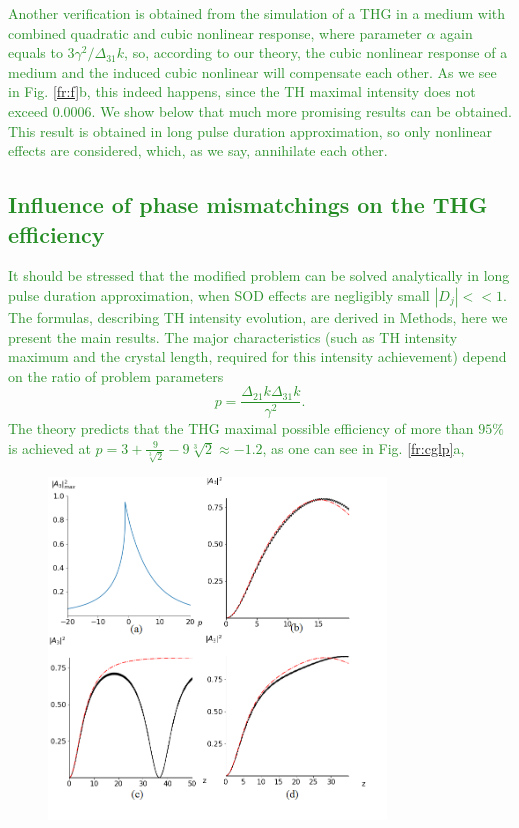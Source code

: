 \documentclass[a4paper, 12pt, onecolumn]{extarticle}
\begin{document}
\textcolor{ForestGreen}
{
Another verification is obtained from the simulation of a THG in a medium with combined quadratic and cubic nonlinear response, where parameter $\alpha$ again equals to $3\gamma^2/\Delta_{31}k$, so, according to our theory, the cubic nonlinear response of a medium and the induced cubic nonlinear will compensate each other. As we see in Fig. \ref{fr:f}b, this indeed happens, since the TH maximal intensity does not exceed $0.0006$. We show below that much more promising results can be obtained. This result is obtained in long pulse duration approximation, so only nonlinear effects are considered, which, as we say, annihilate each other.  
}

\textcolor{ForestGreen}
{
\subsection{Influence of phase mismatchings on the THG efficiency}
It should be stressed that the modified problem can be solved analytically in long pulse duration approximation, when SOD effects are negligibly small $|D_j|<<1$. The formulas, describing TH intensity evolution, are derived in Methods, here we present the main results. The major characteristics (such as TH intensity maximum and the crystal length, required for this intensity achievement) depend on the ratio of problem parameters
$$
p=\frac{\Delta_{21}k\Delta_{31}k}{\gamma^2}.
$$
The theory predicts that the THG maximal possible efficiency of more than $95\%$ is achieved at $p=3+ \frac{9}{\sqrt[3]{2}}-9\sqrt[3]{2}\approx-1.2$, as one can see in Fig. \ref{fr:cglp}a,
\begin{figure}
    \centering
    \includegraphics[width=0.8\textwidth, height=0.4\textheight]{CGLP.png}

\end{figure}}
\end{document}
